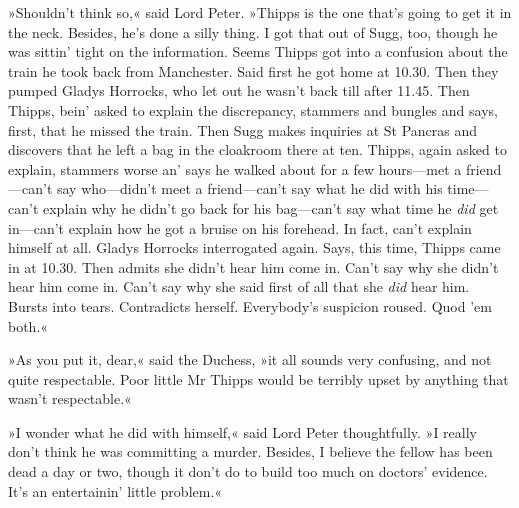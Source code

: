 »Shouldn't think so,« said Lord Peter. »Thipps is the one that's going to get it in the neck. Besides, he's done a silly thing. I got that out of Sugg, too, though he was sittin' tight on the information. Seems Thipps got into a confusion about the train he took back from Manchester. Said first he got home at 10.30. Then they pumped Gladys Horrocks, who let out he wasn't back till after 11.45. Then Thipps, bein' asked to explain the discrepancy, stammers and bungles and says, first, that he missed the train. Then Sugg makes inquiries at St Pancras and discovers that he left a bag in the cloakroom there at ten. Thipps, again asked to explain, stammers worse an' says he walked about for a few hours—met a friend—can't say who—didn't meet a friend—can't say what he did with his time—can't explain why he didn't go back for his bag—can't say what time he \textit{did} get in—can't explain how he got a bruise on his forehead. In fact, can't explain himself at all. Gladys Horrocks interrogated again. Says, this time, Thipps came in at 10.30. Then admits she didn't hear him come in. Can't say why she didn't hear him come in. Can't say why she said first of all that she \textit{did} hear him. Bursts into tears. Contradicts herself. Everybody's suspicion roused. Quod 'em both.«

»As you put it, dear,« said the Duchess, »it all sounds very confusing, and not quite respectable. Poor little Mr Thipps would be terribly upset by anything that wasn't respectable.«

»I wonder what he did with himself,« said Lord Peter thoughtfully. »I really don't think he was committing a murder. Besides, I believe the fellow has been dead a day or two, though it don't do to build too much on doctors' evidence. It's an entertainin' little problem.«

